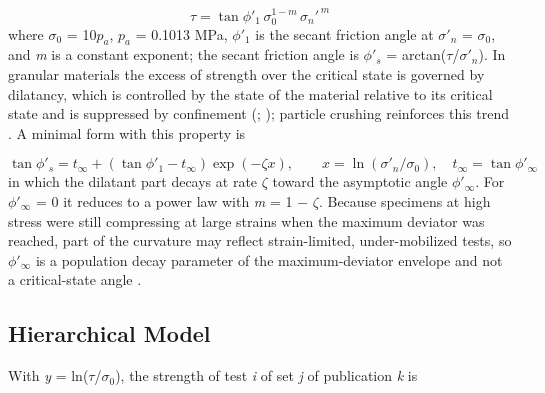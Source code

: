 \documentclass[Journal,letterpaper]{ascelike-new}
\begin{document}
\begin{equation}
\tau=\tan\phi'_1\,\sigma_0^{1-m}\,\sigma_n'^{\,m}
\end{equation}
\noindent where $\sigma_0$ = 10$p_a$, $p_a$ = 0.1013 MPa, $\phi'_1$ is the secant friction angle at $\sigma'_n$ = $\sigma_0$, and \textit{m} is a constant exponent; the secant friction angle is $\phi'_s$ = arctan($\tau$/$\sigma'_n$). In granular materials the excess of strength over the critical state is governed by dilatancy, which is controlled by the state of the material relative to its critical state and is suppressed by confinement (; ); particle crushing reinforces this trend \cite{hardin1985,mcdowell1998,coop2004,einav2007}. A minimal form with this property is

\begin{equation}
\tan\phi'_s=t_\infty+\left(\tan\phi'_1-t_\infty\right)\exp(-\zeta x),\qquad x=\ln(\sigma'_n/\sigma_0),\quad t_\infty=\tan\phi'_\infty
\end{equation}
\noindent in which the dilatant part decays at rate $\zeta$ toward the asymptotic angle $\phi'_\infty$. For $\phi'_\infty$ = 0 it reduces to a power law with \textit{m} = 1 $-$ $\zeta$. Because specimens at high stress were still compressing at large strains when the maximum deviator was reached, part of the curvature may reflect strain-limited, under-mobilized tests, so $\phi'_\infty$ is a population decay parameter of the maximum-deviator envelope and not a critical-state angle \cite{been1985,russell2004}.

\subsection{Hierarchical Model}
With \textit{y} = ln($\tau$/$\sigma_0$), the strength of test \textit{i} of set \textit{j} of publication \textit{k} is
\end{document}
